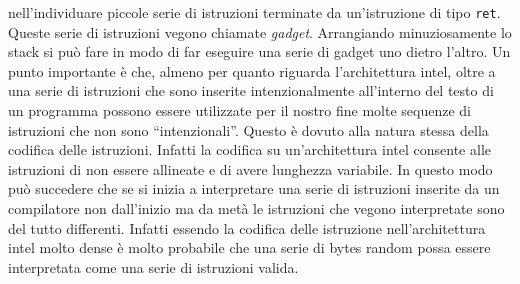 nell'individuare piccole serie di istruzioni terminate da
un'istruzione di tipo \lstinline{ret}. Queste serie di istruzioni
vegono chiamate \emph{gadget}. Arrangiando minuziosamente lo stack si
può fare in modo di far eseguire una serie di gadget uno dietro
l'altro. Un punto importante è che, almeno per quanto riguarda
l'architettura intel, oltre a una serie di istruzioni che sono
inserite intenzionalmente all'interno del testo di un programma
possono essere utilizzate per il nostro fine molte sequenze di
istruzioni che non sono ``intenzionali''. Questo è dovuto alla natura
stessa della codifica delle istruzioni. Infatti la codifica su
un'architettura intel consente alle istruzioni di non essere allineate
e di avere lunghezza variabile. In questo modo può succedere che se si
inizia a interpretare una serie di istruzioni inserite da un
compilatore non dall'inizio ma da metà le istruzioni che vegono
interpretate sono del tutto differenti. Infatti essendo la codifica
delle istruzione nell'architettura intel molto dense è molto probabile
che una serie di bytes random possa essere interpretata come una serie
di istruzioni valida.







